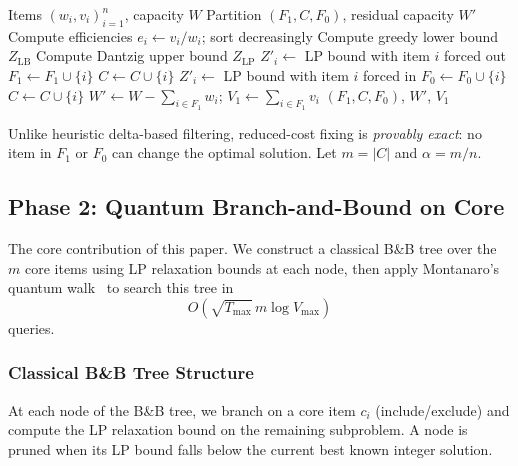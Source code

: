\documentclass[conference]{IEEEtran} \IEEEoverridecommandlockouts
\begin{document}
\begin{algorithm}[h]
\caption{Reduced-Cost Variable Fixing}
\label{alg:filter}
\begin{algorithmic}[1]
\REQUIRE Items $(w_i, v_i)_{i=1}^n$, capacity $W$
\ENSURE Partition $(F_1, C, F_0)$, residual capacity $W'$
\STATE Compute efficiencies $e_i \leftarrow v_i / w_i$; sort decreasingly
\STATE Compute greedy lower bound $Z_{\text{LB}}$
\STATE Compute Dantzig upper bound $Z_{\text{LP}}$
        \STATE $Z'_i \leftarrow$ LP bound with item $i$ forced out
            \STATE $F_1 \leftarrow F_1 \cup \{i\}$ 
        \ELSE
            \STATE $C \leftarrow C \cup \{i\}$
        \ENDIF
    \ELSE
        \STATE $Z'_i \leftarrow$ LP bound with item $i$ forced in
            \STATE $F_0 \leftarrow F_0 \cup \{i\}$ 
        \ELSE
            \STATE $C \leftarrow C \cup \{i\}$
        \ENDIF
    \ENDIF
\ENDFOR
\STATE $W' \leftarrow W - \sum_{i \in F_1} w_i$; $V_1 \leftarrow \sum_{i \in F_1} v_i$
\RETURN $(F_1, C, F_0)$, $W'$, $V_1$
\end{algorithmic}
\end{algorithm}

Unlike heuristic delta-based filtering, reduced-cost fixing is \textit{provably exact}: no item in $F_1$ or $F_0$ can change the optimal solution. Let $m = |C|$ and $\alpha = m/n$.

\subsection{Phase 2: Quantum Branch-and-Bound on Core}

The core contribution of this paper. We construct a classical B\&B tree over the $m$ core items using LP relaxation bounds at each node, then apply Montanaro's quantum walk~\cite{ref24} to search this tree in $$O\!\left(\sqrt{T_{\max}}\,m\log V_{\max}\right)$$ queries.

\subsubsection{Classical B\&B Tree Structure}

At each node of the B\&B tree, we branch on a core item $c_i$ (include/exclude) and compute the LP relaxation bound on the remaining subproblem. A node is pruned when its LP bound falls below the current best known integer solution.
\end{document}
